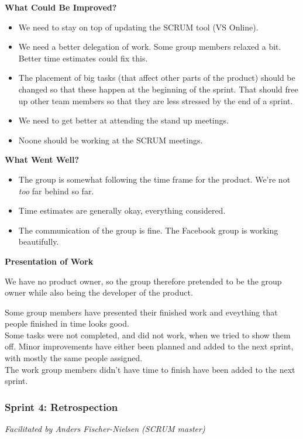 \textbf{What Could Be Improved?}

\begin{itemize}
	\item We need to stay on top of updating the SCRUM tool (VS Online).
	\item We need a better delegation of work. Some group members relaxed a bit. 
	\subitem Better time estimates could fix this.
	\item The placement of big tasks (that affect other parts of the product) should be changed so that these happen at the beginning of the sprint. That should free up other team members so that they are less stressed by the end of a sprint. 
	\item We need to get better at attending the stand up meetings.  
	\item Noone should be working at the SCRUM meetings. 
\end{itemize}

\textbf{What Went Well?}

\begin{itemize}
	\item The group is somewhat following the time frame for the product. We're not \textit{too} far behind so far.
	\item Time estimates are generally okay, everything considered. 
	\item The communication of the group is fine. The Facebook group is working beautifully. 
\end{itemize}

\textbf{Presentation of Work}

We have no product owner, so the group therefore pretended to be the group owner while also being the developer of the product.

Some group members have presented their finished work and eveything that people finished in time looks good.\\
Some tasks were not completed, and did not work, when we tried to show them off. 
Minor improvements have either been planned and added to the next sprint, with mostly the same people assigned.\\
The work group members didn't have time to finish have been added to the next sprint.\\

\subsubsection{Sprint 4: Retrospection}
\label{sec:sprint4}
\small{\textit{Facilitated by Anders Fischer-Nielsen (SCRUM master)}} 

